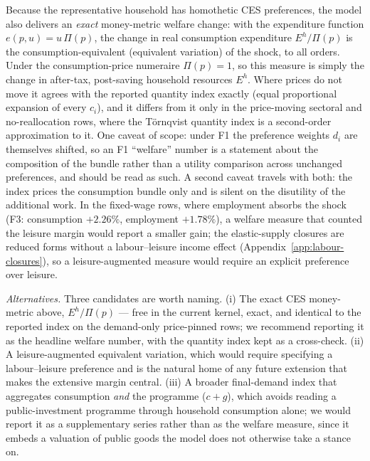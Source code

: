 Because the representative household has homothetic CES preferences, the
model also delivers an \emph{exact} money-metric welfare change: with the
expenditure function $e(p,u)=u\,\Pi(p)$, the change in real consumption
expenditure $E^h/\Pi(p)$ is the consumption-equivalent (equivalent
variation) of the shock, to all orders. Under the consumption-price
numeraire $\Pi(p)=1$, so this measure is simply the change in after-tax,
post-saving household resources $E^h$. Where prices do not move it agrees
with the reported quantity index exactly (equal proportional expansion of
every $c_i$), and it differs from it only in the price-moving sectoral and
no-reallocation rows, where the T\"ornqvist quantity index is a
second-order approximation to it. One caveat of scope: under F1 the
preference weights $d_i$ are themselves shifted, so an F1 ``welfare'' number
is a statement about the composition of the bundle rather than a
utility comparison across unchanged preferences, and should be read as
such.
A second caveat travels with both: the index prices the consumption bundle
only and is silent on the disutility of the additional work. In the
fixed-wage rows, where employment absorbs the shock (F3: consumption
$+2.26\%$, employment $+1.78\%$), a welfare measure that counted the
leisure margin would report a smaller gain; the elastic-supply closures are
reduced forms without a labour--leisure income effect
(Appendix~\ref{app:labour-closures}), so a leisure-augmented measure would
require an explicit preference over leisure.

\emph{Alternatives.} Three candidates are worth naming. (i) The exact CES
money-metric above, $E^h/\Pi(p)$ --- free in the current kernel, exact, and
identical to the reported index on the demand-only price-pinned rows; we
recommend reporting it as the headline welfare number, with the quantity
index kept as a cross-check. (ii) A leisure-augmented equivalent variation,
which would require specifying a labour--leisure preference and is the
natural home of any future extension that makes the extensive margin
central. (iii) A broader final-demand index that aggregates consumption
\emph{and} the programme ($c+g$), which avoids reading a public-investment
programme through household consumption alone; we would report it as a
supplementary series rather than as the welfare measure, since it embeds a
valuation of public goods the model does not otherwise take a stance on.

